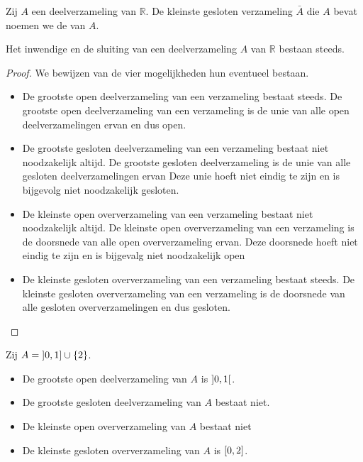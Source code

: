 \documentclass[main.tex]{subfiles}
\begin{document}
\begin{de}
  Zij $A$ een deelverzameling van $\mathbb{R}$.
  De kleinste gesloten verzameling $\bar{A}$ die $A$ bevat noemen we de  van $A$.
\end{de}

\begin{st}
  Het inwendige en de sluiting van een deelverzameling $A$ van $\mathbb{R}$ bestaan steeds.

  \begin{proof}
    We bewijzen van de vier mogelijkheden hun eventueel bestaan.
    \begin{itemize}
    \item De grootste open deelverzameling van een verzameling bestaat steeds.
      De grootste open deelverzameling van een verzameling is de unie van alle open deelverzamelingen ervan en dus open.
    \item De grootste gesloten deelverzameling van een verzameling bestaat niet noodzakelijk altijd.
      De grootste gesloten deelverzameling is de unie van alle gesloten deelverzamelingen ervan
      Deze unie hoeft niet eindig te zijn en is bijgevolg niet noodzakelijk gesloten.
    \item De kleinste open oververzameling van een verzameling bestaat niet noodzakelijk altijd.
      De kleinste open oververzameling van een verzameling is de doorsnede van alle open oververzameling ervan.
      Deze doorsnede hoeft niet eindig te zijn en is bijgevalg niet noodzakelijk open
    \item De kleinste gesloten oververzameling van een verzameling bestaat steeds.
      De kleinste gesloten oververzameling van een verzameling is de doorsnede van alle gesloten oververzamelingen en dus gesloten.
    \end{itemize}
  \end{proof}
\end{st}


\begin{vb}
  Zij $A = \interval[open left]{0}{1} \cup \{2\} $.
  \begin{itemize}
  \item De grootste open deelverzameling van $A$ is $\interval[open]{0}{1}$.
  \item De grootste gesloten deelverzameling van $A$ bestaat niet. 
  \item De kleinste open oververzameling van $A$ bestaat niet
  \item De kleinste gesloten oververzameling van $A$ is $\interval{0}{2}$.
  \end{itemize}
\feed
\end{vb}
\end{document}
